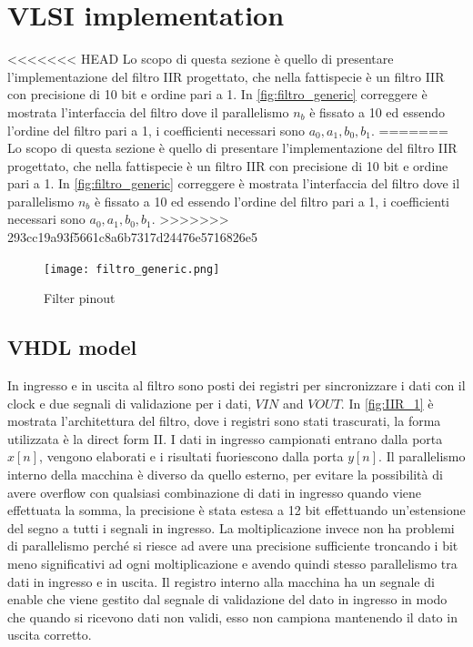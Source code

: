 \section{VLSI implementation}

<<<<<<< HEAD
Lo scopo di questa sezione è quello di presentare l'implementazione del filtro IIR progettato, che nella fattispecie è un filtro IIR con precisione di 10 bit e ordine pari a 1. In \autoref{fig:filtro_generic} {\LARGE correggere} è mostrata l'interfaccia del filtro dove il parallelismo $n_b$ è fissato a 10 ed essendo l'ordine del filtro pari a 1, i coefficienti necessari sono $a_0, a_1, b_0, b_1$. 
=======
Lo scopo di questa sezione è quello di presentare l'implementazione del filtro IIR progettato, che nella fattispecie è un filtro IIR con precisione di 10 bit e ordine pari a 1. In \autoref{fig:filtro_generic} {\LARGE correggere} è mostrata l'interfaccia del filtro dove il parallelismo $n_b$ è fissato a 10 ed essendo l'ordine del filtro pari a 1, i coefficienti necessari sono $a_0, a_1, b_0, b_1$.
>>>>>>> 293cc19a93f5661c8a6b7317d24476e5716826e5

\begin{figure}[h]
	\center
	\texttt{[image: filtro\_generic.png]}
	\caption{Filter pinout}
	\label{fig:filtro_generic}
\end{figure}


\subsection{VHDL model}
In ingresso e in uscita al filtro sono posti dei registri per sincronizzare i dati con il clock e due segnali di validazione per i dati, $VIN$ and $VOUT$. In \autoref{fig:IIR_1} è mostrata l'architettura del filtro, dove i registri sono stati trascurati, la forma utilizzata è la direct form II. I dati in ingresso campionati entrano dalla porta $x[n]$, vengono elaborati e i risultati fuoriescono dalla porta $y[n]$. Il parallelismo interno della macchina è diverso da quello esterno, per evitare la possibilità di avere overflow con qualsiasi combinazione di dati in ingresso quando viene effettuata la somma, la precisione è stata estesa a 12 bit effettuando un'estensione del segno a tutti i segnali in ingresso. La moltiplicazione invece non ha problemi di parallelismo perché si riesce ad avere una precisione sufficiente troncando i bit meno significativi ad ogni moltiplicazione e avendo quindi stesso parallelismo tra dati in ingresso e in uscita. Il registro interno alla macchina ha un segnale di enable che viene gestito dal segnale di validazione del dato in ingresso in modo che quando si ricevono dati non validi, esso non campiona mantenendo il dato in uscita corretto.

